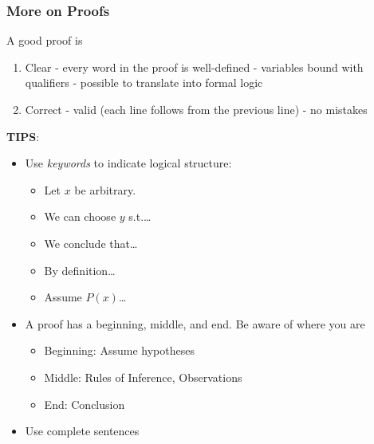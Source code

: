 \documentclass[11pt]{scrartcl}
\begin{document}
\subsubsection{More on Proofs}
\begin{remark}
    A good proof is\begin{enumerate}
        \item Clear - every word in the proof is well-defined - variables bound with qualifiers - possible to translate into formal logic
        \item Correct - valid (each line follows from the previous line) - no mistakes
    \end{enumerate}
\end{remark}
\textbf{TIPS}: \begin{itemize}
    \item Use \textit{keywords} to indicate logical structure: \begin{itemize}
        \item Let $x$ be arbitrary.
        \item We can choose $y$ s.t.\ldots
        \item We conclude that\ldots
        \item By definition\ldots
        \item Assume $P(x)$\ldots
    \end{itemize}
    \item A proof has a beginning, middle, and end.  Be aware of where you are \begin{itemize}
        \item Beginning: Assume hypotheses
        \item Middle: Rules of Inference, Observations
        \item End: Conclusion
    \end{itemize}
    \item Use complete sentences
\end{itemize}
\end{document}
